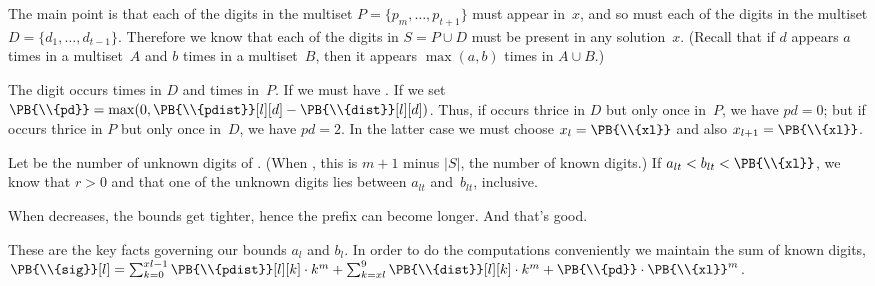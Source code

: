 The main point is that each of the digits in the multiset
$P=\{p_m,\ldots,p_{t+1}\}$ must appear in~$x$, and so must each of the
digits in the multiset $D=\{d_1,\ldots,d_{t-1}\}$. Therefore we know that
each of the digits in $S=P\cup D$ must be present in any solution~$x$.
(Recall that if $d$ appears $a$ times in a multiset~$A$ and $b$ times in
a multiset~$B$, then it appears $\max(a,b)$ times in $A\cup B$.)

The digit  occurs  times in $D$ and  times in~$P$.
If  we must have .
If  we set $\PB{\\{pd}}=\max(0,\PB{\\{pdist}}[l][d]-\PB{%
\\{dist}}[l][d])$.
Thus, if  occurs thrice in $D$ but only
once in~$P$, we have $pd=0$; but if  occurs thrice in $P$ but only
once in~$D$, we have $pd=2$. In the latter case we must choose $x_l=\PB{%
\\{xl}}$
and also $x_{l+1}=\PB{\\{xl}}$.

Let  be the number of unknown digits of . (When , this is
$m+1$ minus $\vert S\vert$, the number of known digits.) If
$a_{lt}<b_{lt}<\PB{\\{xl}}$,
we know that $r>0$ and that one of the unknown digits lies between
$a_{lt}$ and~$b_{lt}$, inclusive.

When  decreases, the bounds get tighter, hence the prefix can
become longer. And that's good.

These are the key facts governing our bounds $a_l$ and $b_l$. In order
to do the computations conveniently we maintain the sum of known digits,
$\PB{\\{sig}}[l]=\sum_{k=0}^{xl-1}\PB{\\{pdist}}[l][k]\cdot k^m+
\sum_{k=xl}^9\PB{\\{dist}}[l][k]\cdot k^m+\PB{\\{pd}}\cdot\PB{\\{xl}}^m$.

